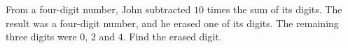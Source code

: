From a four-digit number, John subtracted $10$ times the sum of its digits. The result was a four-digit number, and he erased one of its digits. The remaining three digits were $0$, $2$ and $4$. Find the erased digit.
